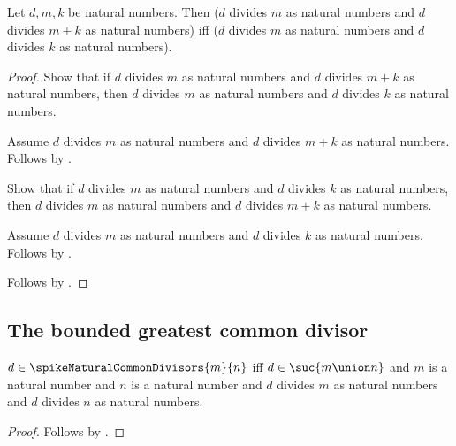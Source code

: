 \begin{corollary}\label{spike15_common_divisor_sum_iff_difference}
    Let $d,m,k$ be natural numbers.
    Then
        ($d$ divides $m$ as natural numbers and
            $d$ divides $m+k$ as natural numbers)
        iff
        ($d$ divides $m$ as natural numbers and
            $d$ divides $k$ as natural numbers).
\end{corollary}
\begin{proof}
    Show that if $d$ divides $m$ as natural numbers and
        $d$ divides $m+k$ as natural numbers,
        then $d$ divides $m$ as natural numbers and
            $d$ divides $k$ as natural numbers.
    \begin{subproof}
        Assume $d$ divides $m$ as natural numbers and
            $d$ divides $m+k$ as natural numbers.
        Follows by .
    \end{subproof}
    Show that if $d$ divides $m$ as natural numbers and
        $d$ divides $k$ as natural numbers,
        then $d$ divides $m$ as natural numbers and
            $d$ divides $m+k$ as natural numbers.
    \begin{subproof}
        Assume $d$ divides $m$ as natural numbers and
            $d$ divides $k$ as natural numbers.
        Follows by .
    \end{subproof}
    Follows by \auto.
\end{proof}

\subsection{The bounded greatest common divisor}

\begin{proposition}\label{spike15_common_divisors_iff}
    $d\in\spikeNaturalCommonDivisors{m}{n}$ iff
        $d\in\suc{m\union n}$ and
        $m$ is a natural number and $n$ is a natural number and
        $d$ divides $m$ as natural numbers and
        $d$ divides $n$ as natural numbers.
\end{proposition}
\begin{proof}
    Follows by .
\end{proof}

